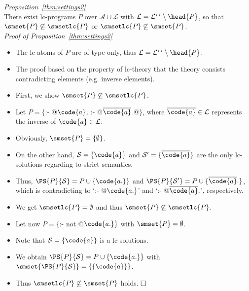 \noindent\textit{Proposition~\ref{thm:settings2}} \\
\noindent    
There exist lc-programs $P$ over $\mathcal{A}\cup\mathcal{L}$ with
\(
\mathcal{L}=\mathcal{L}^\leftrightarrow\setminus\head{P}
\),
so that
\(
\smset{P}\not\subseteq\smsetlc{P}
\)
or
\(
\smsetlc{P}\not\subseteq\smset{P}
\).\\[2mm]
%    
\noindent\textit{Proof of Proposition~\ref{thm:settings2}}
    \begin{itemize}
     \item The lc-atoms of $P$ are of type 
         only, thus 
        \(
        \mathcal{L}=
        \mathcal{L}^\leftrightarrow\setminus\head{P}
        \). 
     \item The proof based on the property of lc-theory 
        that the theory consists contradicting elements (e.g. inverse elements).   
     \item First, we show 
        \(
        \smset{P}\not\subseteq\smsetlc{P}
        \). 
     \item Let $P=\{$\lstinline@ :- @$\code{a}$\lstinline@.  :- @$\overline{\code{a}}$\lstinline@.@$\}$, 
        where          $\overline{\code{a}}\in\mathcal{L}$ 
        represents the inverse of $\code{a}\in\mathcal{L}$. 
     \item Obviously, $\smset{P}=\{\emptyset\}$. 
     \item On the other hand, 
        $\mathcal{S}=\{\code{a}\}$ and 
        $\mathcal{S}'=\{\overline{\code{a}}\}$ 
        are the only lc-solutions regarding to strict semantics. 
     \item Thus, 
        $\PS{P}{\mathcal{S}}=P\cup\{\code{a.}\}$ and 
        $\PS{P}{\mathcal{S}'}=P\cup\{\overline{\code{a}}.\}$, 
        which is contradicting to 
        `\lstinline@ :- @$\code{a.}$' and 
        `\lstinline@:- @$\overline{\code{a}}.$', respectively. 
     \item We get 
        $\smsetlc{P}=\emptyset$ and thus 
        \(
        \smset{P}\not\subseteq\smsetlc{P}
        \). 
     \item Let now $P=\{$\lstinline@:- not @$\code{a.}\}$ 
        with $\smset{P}=\emptyset$. 
     \item Note that $\mathcal{S}=\{\code{a}\}$ is a lc-solutions. 
     \item We obtain 
        \(
        \PS{P}{\mathcal{S}}=
        P\cup\{\code{a.}\}
        \) 
        with 
        \(
        \smset{\PS{P}{\mathcal{S}}}=
        \{\{\code{a}\}\}
        \). 
     \item Thus 
        \(
        \smsetlc{P}\not\subseteq\smset{P}
        \)  
        holds. 
        $\hfill\square$
    \end{itemize}


